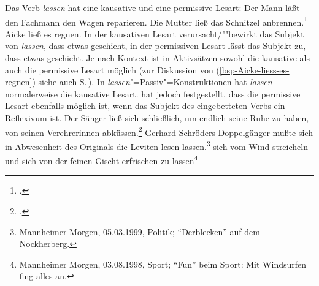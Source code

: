 Das Verb \emph{lassen} hat eine kausative
und eine permissive Lesart:
\eal
\ex Der Mann läßt den Fachmann den Wagen reparieren.
\ex Die Mutter ließ das Schnitzel anbrennen.\label{bsp-schnitzel-anbrennen}\footnote{
        .%
      }
\ex Aicke ließ es regnen.\label{bsp-Aicke-liess-es-regnen}
\zl
In der kausativen Lesart verursacht/""bewirkt das Subjekt von \emph{lassen},
dass etwas geschieht, in der permissiven Lesart lässt das Subjekt zu, dass
etwas geschieht. Je nach Kontext ist in Aktivsätzen sowohl die kausative
als auch die permissive Lesart möglich (zur Diskussion von (\ref{bsp-Aicke-liess-es-regnen})
siehe auch S.\,\pageref{bsp-Aicke-laesst-es-regnen}).
%
In \emph{lassen}"=Passiv"=Konstruktionen hat \emph{lassen} normalerweise die 
kausative Lesart.
\citet[]{Reis76c} hat jedoch festgestellt, dass die
permissive Lesart ebenfalls möglich ist,
wenn das Subjekt des eingebetteten Verbs ein Reflexivum ist.
\eal
\label{bsp-lassen-passiv-permissiv}
\ex 
Der Sänger ließ sich schließlich, um endlich seine Ruhe zu haben, von seinen Verehrerinnen abküssen.\footnote{
        .%
}
\ex{}
Gerhard Schröders Doppelgänger mußte sich in Abwesenheit des Originals die Leviten lesen lassen.\footnote{
Mannheimer Morgen, 05.03.1999, Politik; "`Derblecken"' auf dem Nockherberg.%
}
\label{ex-leviten-lassen}
\ex 
sich vom Wind streicheln und sich von der feinen Gischt erfrischen zu lassen\label{ex-sich-vom-wind-streicheln-lassen}\footnote{
Mannheimer Morgen, 03.08.1998, Sport; "`Fun"' beim Sport: Mit Windsurfen fing alles an.%
}
\zl
